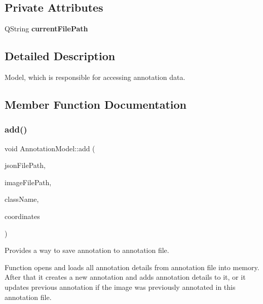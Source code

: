\subsection*{Private Attributes}
\begin{DoxyCompactItemize}
\item 
\mbox{\label{classAnnotationModel_a204571a62dfdc60a405528ddc1db2a61}} 
Q\+String {\bfseries current\+File\+Path}
\end{DoxyCompactItemize}


\subsection{Detailed Description}
Model, which is responsible for accessing annotation data. 

\subsection{Member Function Documentation}
\mbox{\label{classAnnotationModel_a02d0db67913a024ee7a7dde190388bb0}} 
\subsubsection{\texorpdfstring{add()}{add()}\hspace{0.1cm}{\footnotesize\ttfamily [1/2]}}
{\footnotesize\ttfamily void Annotation\+Model\+::add (\begin{DoxyParamCaption}\item[{const Q\+String \&}]{json\+File\+Path,  }\item[{const Q\+String \&}]{image\+File\+Path,  }\item[{const Q\+String \&}]{class\+Name,  }\item[{\hyperlink{classLinkedList}{Linked\+List}$<$ std\+::pair$<$ int, int $>$$>$ \&}]{coordinates }\end{DoxyParamCaption})}



Provides a way to save annotation to annotation file. 

Function opens and loads all annotation details from annotation file into memory. After that it creates a new annotation and adds annotation details to it, or it updates previous annotation if the image was previously annotated in this annotation file.

